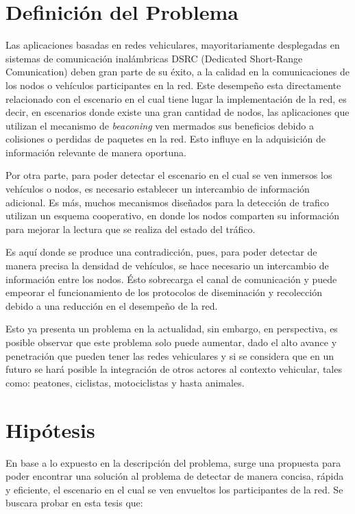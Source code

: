 \section{Definición del Problema}
Las aplicaciones basadas en redes vehiculares, mayoritariamente desplegadas en sistemas de comunicación inalámbricas DSRC (Dedicated Short-Range Comunication) deben gran parte de su éxito, a la calidad en la comunicaciones de los nodos o vehículos participantes en la red. Este desempeño esta directamente relacionado con el escenario en el cual tiene lugar la implementación de la red, es decir, en escenarios donde existe una gran cantidad de nodos, las aplicaciones que utilizan el mecanismo de \textit{beaconing} ven mermados sus beneficios debido a colisiones o perdidas de paquetes en la red. Esto influye en la adquisición de información relevante de manera oportuna. 

Por otra parte, para poder detectar el escenario en el cual se ven inmersos los vehículos o nodos, es necesario establecer un intercambio de información adicional. Es más, muchos mecanismos diseñados para la detección de trafico utilizan un esquema cooperativo, en donde los nodos comparten su información para mejorar la lectura que se realiza del estado del tráfico.

Es aquí donde se produce una contradicción, pues, para poder detectar de manera precisa la densidad de vehículos, se hace necesario un intercambio de información entre los nodos. Ésto sobrecarga el canal de comunicación y puede empeorar el funcionamiento de los protocolos de diseminación y recolección debido a una reducción en el desempeño de la red. 

Esto ya presenta un problema en la actualidad, sin embargo, en perspectiva, es posible observar que este problema solo puede aumentar, dado el alto avance y penetración que pueden tener las redes vehiculares y si se considera que en un futuro se hará posible la integración de otros actores al contexto vehicular, tales como: peatones, ciclistas, motociclistas y hasta animales. 

\section{Hipótesis}
En base a lo expuesto en la descripción del problema, surge una propuesta para poder encontrar una solución al problema de detectar de manera concisa, rápida y eficiente, el escenario en el cual se ven envueltos los participantes de la red. Se buscara probar en esta tesis que:

